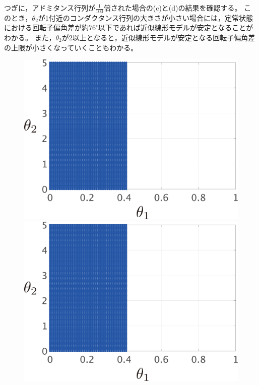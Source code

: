 \documentclass[tombow,dvipdfmx]{corona-a5-1.1}
\begin{document}
\begin{例}[近似線形モデルの数値的な安定性解析]
つぎに，アドミタンス行列が$\tfrac{1}{100}$倍された場合の(c)と(d)の結果を確認する。
このとき，$\theta_2$が1付近のコンダクタンス行列の大きさが小さい場合には，定常状態における回転子偏角差が約$76^\circ$以下であれば近似線形モデルが安定となることがわかる。
また，$\theta_2$が2以上となると，近似線形モデルが安定となる回転子偏角差の上限が小さくなっていくこともわかる。
\end{例}

\begin{figure}[t!]
  \centering
  {
  \begin{minipage}{0.49\linewidth}
    \centering
    \includegraphics[width = 0.90\linewidth]{figs/Y1D1}
    \medskip
  \end{minipage}
  \begin{minipage}{0.49\linewidth}
    \centering
    \includegraphics[width = 0.90\linewidth]{figs/Y1D0.01}

\end{minipage}}
\end{figure}
\end{document}
